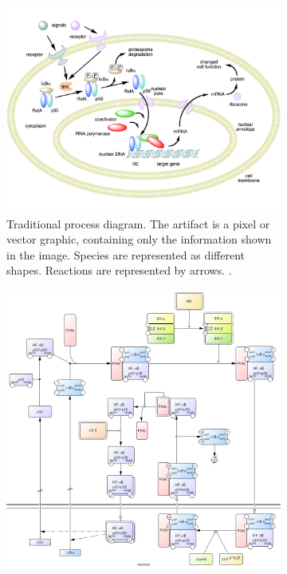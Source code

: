 \documentclass[
	fontsize=10pt, %
	twoside=false, %
	secnumdepth=1, %
  toc=indentunnumbered %
]{kaobook}
\begin{document}
\begin{figure}[h]
  \centering
  \begin{subfigure}{0.4\textwidth}
    \centering
    \includegraphics[width=\textwidth]{NF-kB-mechanism/handdrawn.png}
    \caption{Traditional process diagram. The artifact is a pixel or vector
      graphic, containing only the information shown in the image. Species are
      represented as different shapes. Reactions are represented by arrows.
      \cite{boghog2_NFkBMechanismAction_2007} .}
    \label{fig:process-diagram-old-vs-new:handdrawn}
  \end{subfigure}
  \hspace{1em}
  \begin{subfigure}{0.4\textwidth}
    \centering
    \includegraphics[width=\textwidth]{NF-kB-mechanism/CellDesigner.png}

\end{subfigure}
\end{figure}
\end{document}
